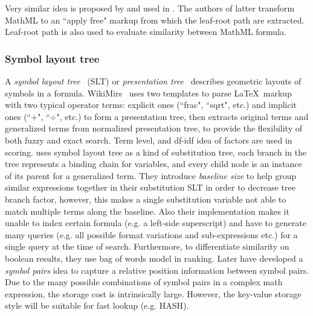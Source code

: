 Very similar idea is proposed by \cite{signifjap} and used in \cite{signfused}. The authors of latter transform MathML to an ``apply free" markup from which the leaf-root path are extracted. Leaf-root path is also used to evaluate similarity between MathML formula.

\subsubsection*{Symbol layout tree}
A \textit{symbol layout tree}~\cite{symbollayout12} (SLT) or \textit{presentation tree}~\cite{WikiMirs13} describes geometric layouts of symbols in a formula. 
WikiMirs~\cite{WikiMirs13} uses two templates to parse \LaTeX\  markup with two typical operator terms: explicit ones (``\bbb frac", ``\bbb sqrt", etc.) and implicit ones (``$+$", ``$\div$", etc.) to form a presentation tree, then extracts original terms and generalized terms from normalized presentation tree, to provide the flexibility of both fuzzy and exact search. Term level, and df-idf idea of factors are used in scoring.
\cite{symbollayout12} uses symbol layout tree as a kind of substitution tree, each branch in the tree represents a binding chain for variables, and every child node is an instance of its parent for a generalized term. 
They introduce \textit{baseline size} to help group similar expressions together in their substitution SLT in order to decrease tree branch factor, however, this makes a single substitution variable not able to match multiple terms along the baseline. 
Also their implementation makes it unable to index certain formula (e.g. a left-side superscript) and have to generate many queries (e.g. all possible format variations and sub-expressions etc.) for a single query at the time of search.
Furthermore, to differentiate similarity on boolean results, they use bag of words model in ranking.
Later \cite{symbolpairs15,symbolpair15:2} have developed a \textit{symbol pairs} idea to capture a relative position information between symbol pairs. Due to the many possible combinations of symbol pairs in a complex math expression, the storage cost is intrinsically large. However, the key-value storage style will be suitable for fast lookup (e.g. HASH). 

